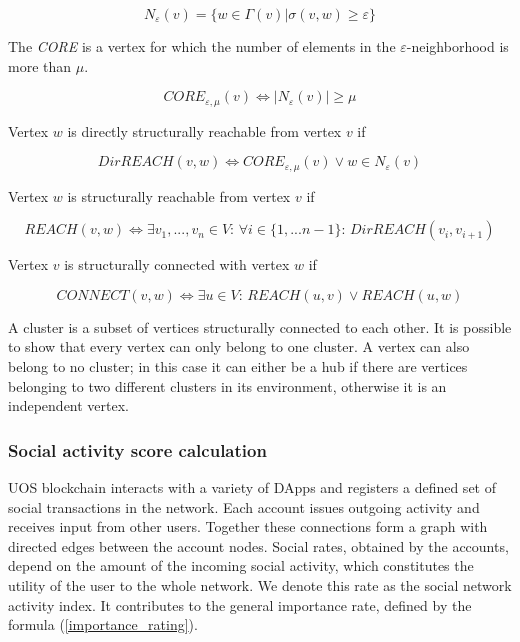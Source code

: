 \documentclass[a4paper,12pt]{article}
\begin{document}
$$
N_{\varepsilon}(v) = \{ w \in \Gamma(v) | \sigma(v,w) \ge \varepsilon \}
$$

The \textit{CORE} is a vertex for which the number of elements in the $\varepsilon$-neighborhood is more than $\mu$.

$$
CORE_{\varepsilon,\mu}(v) \Leftrightarrow |N_{\varepsilon} (v)| \ge \mu
$$

Vertex $w$ is directly structurally reachable from vertex $v$ if



$$
DirREACH(v,w) \Leftrightarrow CORE_{\varepsilon,\mu}(v) \vee w \in N_{\varepsilon}(v)
$$

Vertex $w$ is structurally reachable from vertex $v$ if


$$
REACH(v,w) \Leftrightarrow \exists v_1,...,v_n \in V \text{: } \forall i \in \{1,...n-1\} \text{: } DirREACH(v_i,v_{i+1})
$$

Vertex $v$ is structurally connected with vertex $w$ if



$$
CONNECT(v,w) \Leftrightarrow \exists u \in V\text{: } REACH(u,v) \vee REACH(u,w)
$$

A cluster is a subset of vertices structurally connected to each other. It is possible to show that every vertex can only belong to one cluster. A vertex can also belong to no cluster; in this case it can either be a hub if there are vertices belonging to two different clusters in its environment, otherwise it is an independent vertex.




\subsubsection{Social activity score calculation}

U{\degree}OS blockchain interacts with a variety of DApps and registers a defined set of social transactions in the network. Each account issues outgoing activity and receives input from other users. Together these connections form a graph with directed edges between the account nodes. Social rates, obtained by the accounts, depend on the amount of the incoming social activity, which constitutes the utility of the user to the whole network. We denote this rate as the social network activity index. It contributes to the general importance rate, defined by the formula (\ref{importance_rating}).  
\end{document}
